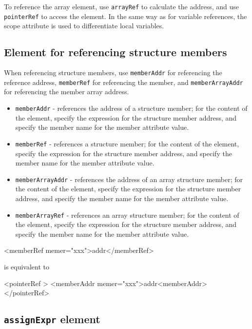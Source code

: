 To reference the array element, use {\tt arrayRef} to calculate the address, and use {\tt pointerRef} to access the element. 
In the same way as for variable references, the scope attribute is used to differentiate local variables.


\subsection{Element for referencing structure members}

When referencing structure members, use {\tt memberAddr} for referencing the reference address, {\tt memberRef} for referencing the member, and {\tt memberArrayAddr} for referencing the member array address. 

\begin{itemize}
\item {\tt memberAddr} - references the address of a structure member;
      for the content of the element, specify the expression for the structure member address, and specify the member name for the member attribute value. 
\item {\tt memberRef} - references a structure member;
      for the content of the element, specify the expression for the structure member address, and specify the member name for the member attribute value. 
\item {\tt memberArrayAddr} - references the address of an array structure member;
      for the content of the element, specify the expression for the structure member address, and specify the member name for the member attribute value. 
\item {\tt memberArrayRef} - references an array structure member;
      for the content of the element, specify the expression for the structure member address, and specify the member name for the member attribute value. 
\end{itemize}
\vspace{1mm}

\begin{XcodeMLExample}
<memberRef memer="xxx">addr</memberRef>
\end{XcodeMLExample}

is equivalent to
\vspace{2mm}

\begin{XcodeMLExample}
<pointerRef >
  <memberAddr memer="xxx">addr<memberAddr>
</pointerRef>
\end{XcodeMLExample}


\subsection{ {\tt assignExpr} element}

